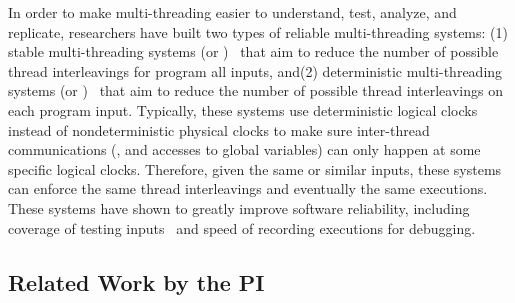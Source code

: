   In order to make multi-threading easier to 
understand, test, analyze, and replicate, researchers have built two types of 
reliable multi-threading systems: (1) stable multi-threading systems (or 
\smt)~\cite{grace:oopsla09, dthreads:sosp11, determinator:osdi10} 
that aim to reduce the number of possible thread interleavings for program all 
inputs, and(2) deterministic multi-threading systems (or 
\dmt)~\cite{dpj:oopsla09,dmp:asplos09,kendo:asplos09,coredet:asplos10,
dos:osdi10,ddos:asplos13, ics:oopsla13} that aim to reduce the number of 
possible thread interleavings on each program input. Typically, these systems 
use deterministic logical clocks 
instead of nondeterministic physical clocks to make sure inter-thread 
communications (\eg, \mutexlock and accesses to global variables) can only 
happen at some specific logical clocks. Therefore, given the same or similar 
inputs, these systems can enforce the same thread interleavings and eventually 
the same executions. These systems 
have shown to greatly improve software reliability, including coverage of 
testing inputs~\cite{ics:oopsla13} and speed of recording 
executions\cite{dos:osdi10} for debugging.


% 


\subsection{Related Work by the PI} \label{sec:my-work}
% 

